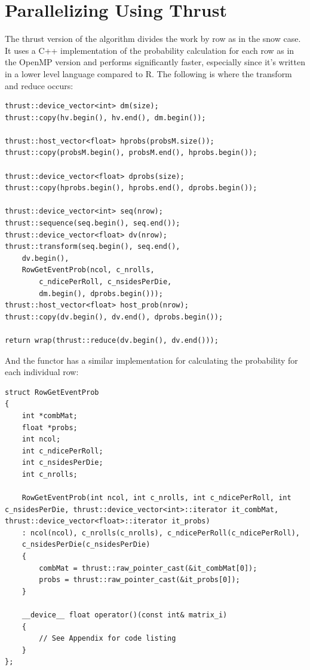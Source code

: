 \documentclass[12pt]{article}
\begin{document}
\section{Parallelizing Using Thrust}

The thrust \cite{thrust} version of the algorithm divides the work by row as in the snow case. It uses a C++ implementation of the probability calculation for each row as in the OpenMP version and performs significantly faster, especially since it's written in a lower level language compared to R. The following is where the transform and reduce occurs:

\begin{lstlisting}
thrust::device_vector<int> dm(size);
thrust::copy(hv.begin(), hv.end(), dm.begin());

thrust::host_vector<float> hprobs(probsM.size());
thrust::copy(probsM.begin(), probsM.end(), hprobs.begin());

thrust::device_vector<float> dprobs(size);
thrust::copy(hprobs.begin(), hprobs.end(), dprobs.begin());

thrust::device_vector<int> seq(nrow);
thrust::sequence(seq.begin(), seq.end());
thrust::device_vector<float> dv(nrow);
thrust::transform(seq.begin(), seq.end(),
	dv.begin(),
	RowGetEventProb(ncol, c_nrolls, 
		c_ndicePerRoll, c_nsidesPerDie, 
		dm.begin(), dprobs.begin()));
thrust::host_vector<float> host_prob(nrow);
thrust::copy(dv.begin(), dv.end(), dprobs.begin());

return wrap(thrust::reduce(dv.begin(), dv.end()));
\end{lstlisting}

And the functor has a similar implementation for calculating the probability for each individual row:

\begin{lstlisting}
struct RowGetEventProb
{
	int *combMat;
	float *probs;
	int ncol;
	int c_ndicePerRoll;
	int c_nsidesPerDie;
	int c_nrolls;
	
	RowGetEventProb(int ncol, int c_nrolls, int c_ndicePerRoll, int c_nsidesPerDie, thrust::device_vector<int>::iterator it_combMat, thrust::device_vector<float>::iterator it_probs)
	: ncol(ncol), c_nrolls(c_nrolls), c_ndicePerRoll(c_ndicePerRoll), 
	c_nsidesPerDie(c_nsidesPerDie)
	{
		combMat = thrust::raw_pointer_cast(&it_combMat[0]);
		probs = thrust::raw_pointer_cast(&it_probs[0]);
	}
	
	__device__ float operator()(const int& matrix_i)
	{
		// See Appendix for code listing
	}
};

\end{lstlisting}
\end{document}
